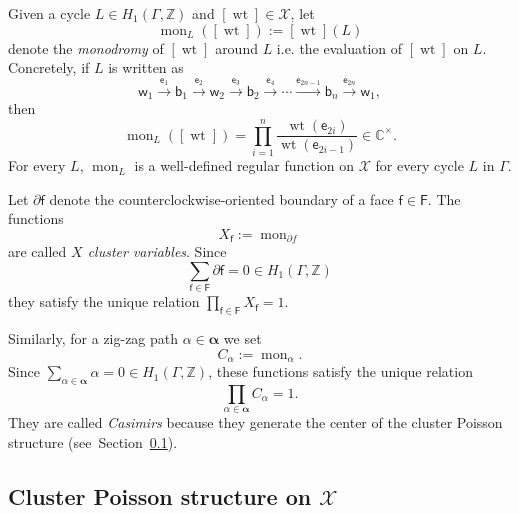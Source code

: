 \documentclass[dvipsnames,11pt]{article}
\theoremstyle{definition}
\newcommand{\wt}{\operatorname{wt}}
\newcommand{\Z}{{\mathbb Z}}
\newcommand{\C}{{\mathbb C}}
\def\w{\mathsf w}
\def\b{\mathsf b}
\def\vert{\mathsf v}
\def\e{\mathsf e}
\def\f{\mathsf f}
\def\F{\mathsf F}
\def\graph{\Gamma}
\def\zz{\bm \alpha}
\def\mon{\operatorname{mon}}
\begin{document}
Given a cycle $L \in H_1(\graph,\Z)$ and $[\wt] \in \mathcal X$, let 
\[
\mon_L([\wt]) := [\wt](L)
\]
denote the \emph{monodromy} of $[\wt]$ around $L$ i.e. the evaluation of $[\wt]$ on $L$. Concretely, if $L$ is written as 
\[
\w_1 \xrightarrow{\e_1} \b_1 \xrightarrow{\e_2} \w_2 \xrightarrow{\e_3} \b_2 \xrightarrow{\e_4} \cdots
\xrightarrow{\e_{2n-1}} \b_n \xrightarrow{\e_{2n}} \w_1,
\]
then
\begin{equation}\label{eq:monodromy}
\mon_L([\wt])=\prod_{i=1}^n \frac{\wt(\e_{2i})}{\wt(\e_{2i-1})} \in \C^\times.
\end{equation}
For every $L$, $\mon_L$ is a well-defined regular
function on $\mathcal X$ for every cycle $L$ in $\graph$.

Let $\partial \f$ denote the counterclockwise-oriented boundary of a face $\f \in \F$. The functions 
\[
X_\f := \mon_{\partial f}
\]
are called \emph{$X$ cluster variables}. Since 
\[
\sum_{\f \in \F} \partial \f = 0 \in H_1(\graph,\Z)
\]
they satisfy the unique relation $\prod_{\f \in \F} X_\f = 1$.

Similarly, for a zig-zag path $\alpha\in\zz$ we set
\[
C_\alpha:=\mon_\alpha.
\]
Since $\sum_{\alpha \in \zz} \alpha =0 \in H_1(\graph,\Z)$, these functions satisfy the unique relation
\[
\prod_{\alpha\in\zz} C_\alpha=1.
\]
They are called \emph{Casimirs} because they generate the center of the cluster Poisson structure (see~Section~\ref{sec:xpoisson}).



\subsection{Cluster Poisson structure on \texorpdfstring{$\mathcal X$}{X}}\label{sec:xpoisson}
\end{document}
